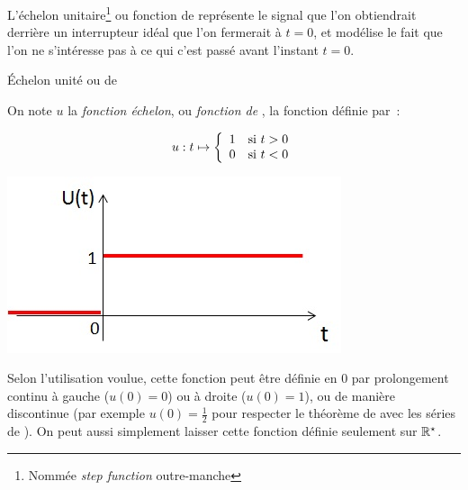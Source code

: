         L'échelon unitaire\footnote{Nommée \emph{step function}
          outre-manche} ou fonction de \Heaviside{} représente le
        signal que l'on obtiendrait derrière un interrupteur idéal que
        l'on fermerait à $t = 0$, et modélise le fait que l'on ne
        s'intéresse pas à ce qui c'est passé avant l'instant $t=0$.
        \begin{definition}{Échelon unité ou de \Heaviside{}}

          On note $u$ la \emph{fonction échelon}, ou \emph{fonction de
            \Heaviside{}}, la fonction définie par~:\newline
	\begin{minipage}[l]{0.4\linewidth}
          \begin{equation}
          \label{eq:heaviside}
          u : t \mapsto \left \{
            \begin{array}{l l}
              1  & \text{si }t>0 \\
              0   & \text{si }t<0 
            \end{array}
          \right .	 	
	\end{equation}
	\end{minipage}\hfill
	\begin{minipage}[r]{0.55\textwidth}
          \includegraphics[width=0.9\linewidth]{images/Heaviside.jpg}
	\end{minipage}
      \end{definition}
      \begin{remarque}
        Selon l'utilisation voulue, cette fonction peut être définie
        en 0 par prolongement continu à gauche ($u(0)=0$) ou à droite
        ($u(0)=1$), ou de manière discontinue (par exemple
        $u(0)=\frac{1}{2}$ pour respecter le théorème de \Dirichlet{}
        avec les séries de \Fourier{}). On peut aussi simplement laisser
        cette fonction définie seulement sur $\mathbb{R}^{\star}$.
      \end{remarque}
        
